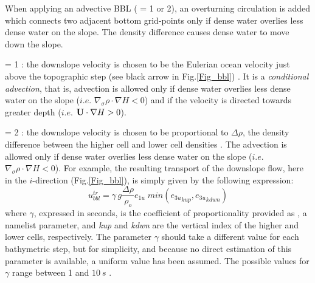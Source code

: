 

When applying an advective BBL ( = 1 or 2), an overturning 
circulation is added which connects two adjacent bottom grid-points only if dense 
water overlies less dense water on the slope. The density difference causes dense 
water to move down the slope. 

 = 1 : the downslope velocity is chosen to be the Eulerian
ocean velocity just above the topographic step (see black arrow in Fig.\ref{Fig_bbl}) 
\citep{Beckmann_Doscher1997}. It is a \textit{conditional advection}, that is, advection
is allowed only if dense water overlies less dense water on the slope ($i.e.$ 
$\nabla_\sigma \rho  \cdot  \nabla H<0$) and if the velocity is directed towards 
greater depth ($i.e.$ $\mathbf{U}  \cdot  \nabla H>0$).

 = 2 : the downslope velocity is chosen to be proportional to $\Delta \rho$,
the density difference between the higher cell and lower cell densities \citep{Campin_Goosse_Tel99}.
The advection is allowed only  if dense water overlies less dense water on the slope ($i.e.$ 
$\nabla_\sigma \rho  \cdot  \nabla H<0$). For example, the resulting transport of the 
downslope flow, here in the $i$-direction (Fig.\ref{Fig_bbl}), is simply given by the 
following expression:
\begin{equation} \label{Eq_bbl_Utr}
 u^{tr}_{bbl} = \gamma \, g \frac{\Delta \rho}{\rho_o}  e_{1u} \; min \left( {e_{3u}}_{kup},{e_{3u}}_{kdwn} \right)
\end{equation}
where $\gamma$, expressed in seconds, is the coefficient of proportionality 
provided as , a namelist parameter, and \textit{kup} and \textit{kdwn} 
are the vertical index of the higher and lower cells, respectively.
The parameter $\gamma$ should take a different value for each bathymetric 
step, but for simplicity, and because no direct estimation of this parameter is 
available, a uniform value has been assumed. The possible values for $\gamma$ 
range between 1 and $10~s$ \citep{Campin_Goosse_Tel99}.  


